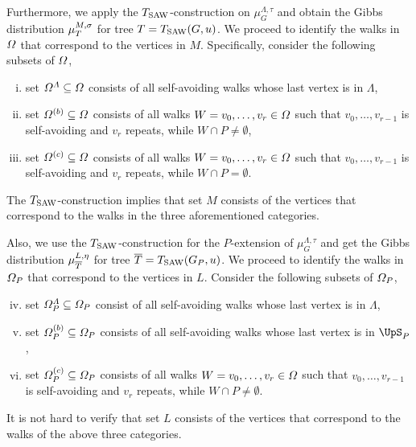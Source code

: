 \documentclass[11pt,reqno]{amsart}
\numberwithin{equation}{section}
\newcommand{\blue}[1]{{\color{blue}#1}}
\newcommand{\bostonuniversityred}[1]{{\color{bostonuniversityred}#1}}
\newcommand{\cadmiumorange}[1]{{\color{cadmiumorange}#1}}
\newcommand{\electricviolet}[1]{{\color{electricviolet}#1}}
\newcommand{\goldenbrown}[1]{{\color{goldenbrown}#1}}
\newcommand{\red}[1]{{\color{red}#1}}
\newcommand{\Tsaw}{T_{\rm SAW}}
\renewcommand{\blue}[1]{#1}
\renewcommand{\bostonuniversityred}[1]{#1}
\renewcommand{\cadmiumorange}[1]{#1}
\renewcommand{\electricviolet}[1]{#1}
\renewcommand{\goldenbrown}[1]{#1}
\renewcommand{\red}[1]{#1}
\newcommand{\kL}{\cadmiumorange{L}}
\newcommand{\kP}{\goldenbrown{P}}
\newcommand{\kr}{\bostonuniversityred{r}}%
\newcommand{\ku}{\red{u}}
\newcommand{\kv}{\electricviolet{v}}
\newcommand{\kW}{\blue{W}}
\renewcommand{\kL}{L}
\renewcommand{\kP}{P}
\renewcommand{\kr}{r}
\renewcommand{\ku}{u}
\renewcommand{\kv}{v}
\renewcommand{\kW}{W}
\begin{document}
Furthermore,  we apply the $\Tsaw$-construction on $\mu^{\Lambda,\tau}_G$ and obtain the Gibbs distribution $\mu^{M,\sigma}_{T}$ 
for tree $\SMTu=\Tsaw(G,\ku)$. We proceed to identify the walks in $\Omega$ that correspond to the vertices in $M$. 
Specifically, consider the following subsets of $\Omega$,
\begin{enumerate}[(i)]
\item set $\Omega^{\Lambda}\subseteq \Omega$ consists of all self-avoiding walks whose last vertex is in $\Lambda$,
\item set $\Omega^{(b)}\subseteq \Omega$ consists of all walks $\kW=\kv_0, \ldots, \kv_{\kr} \in \sawpaths$ such that $\kv_0, \ldots, \kv_{\kr-1}$ is self-avoiding and
$\kv_{\kr}$  repeats, while  $\kW\cap \kP\neq \emptyset$,  
\item set $\Omega^{(c)}\subseteq \Omega$ consists of all walks $\kW=\kv_0, \ldots, \kv_{\kr} \in \sawpaths$ such that $\kv_0, \ldots, \kv_{\kr-1}$ is self-avoiding and
$\kv_{\kr}$  repeats, while  $\kW\cap \kP= \emptyset$. 
\end{enumerate}
The $\Tsaw$-construction implies that set $M$ consists of the vertices that correspond to  the walks in the three aforementioned categories. 

Also,   we use the $\Tsaw$-construction for the $\kP$-extension of $\mu^{\Lambda,\tau}_G$  and get  the Gibbs distribution 
$\mu^{\kL,\eta}_{\SMTPu}$ for tree $\SMTPu=\Tsaw(\gext{G}{\kP},\ku)$. 
We proceed to identify the walks in $\sawpaths_{\kP}$ that correspond to the vertices in $\kL$. 
Consider the following subsets of $\sawpaths_{\kP}$, 
\begin{enumerate}[(i)]
\setcounter{enumi}{3}
\item set $\sawpaths^{\Lambda}_{\kP}\subseteq \sawpaths_{\kP}$ consist of all self-avoiding walks whose last vertex is in $\Lambda$,
% 
\item set $\sawpaths^{(b)}_{\kP}\subseteq \sawpaths_{\kP}$ consists of all self-avoiding walks whose last vertex is in $\ssplit_{\kP}$, 
%
\item set $\sawpaths^{(c)}_{\kP}\subseteq \sawpaths_{\kP}$ consists of all walks $\kW=\kv_0, \ldots, \kv_{\kr} \in \sawpaths$ 
such that $\kv_0, \ldots, \kv_{\kr-1}$ is self-avoiding and
$\kv_{\kr}$  repeats, while  $\kW\cap \kP\neq \emptyset$. 
%
\end{enumerate}
It is not hard to verify that set $\kL$ consists of the vertices that correspond to the walks of the above three categories. 
\end{document}
